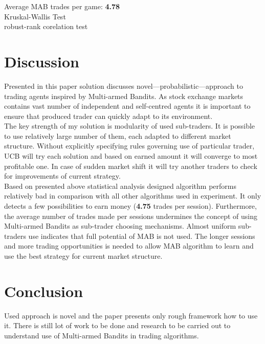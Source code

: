 \documentclass{llncs}
\begin{document}
Average MAB trades per game: \textbf{4.78}\\


Kruskal-Wallis Test\\
robust-rank corelation test

\section{Discussion}
Presented in this paper solution discusses novel---probabilistic---approach to trading agents inspired by Multi-armed Bandits. As stock exchange markets contains vast number of independent and self-centred agents it is important to ensure that produced trader can quickly adapt to its environment.\\
The key strength of my solution is modularity of used sub-traders. It is possible to use relatively large number of them, each adapted to different market structure. Without explicitly specifying rules governing use of particular trader, UCB will try each solution and based on earned amount it will converge to most profitable one. In case of sudden market shift it will try another traders to check for improvements of current strategy.\\

Based on presented above statistical analysis designed algorithm performs relatively bad in comparison with all other algorithms used in experiment. It only detects a few possibilities to earn money (\textbf{4.75} trades per session). Furthermore, the average number of trades made per sessions undermines the concept of using Multi-armed Bandits as sub-trader choosing mechanisms. Almost uniform sub-traders use indicates that full potential of MAB is not used. The longer sessions and more trading opportunities is needed to allow MAB algorithm to learn and use the best strategy for current market structure.\\


\section{Conclusion}
Used approach is novel and the paper presents only rough framework how to use it. There is still lot of work to be done and research to be carried out to understand use of Multi-armed Bandits in trading algorithms.\\
\end{document}
